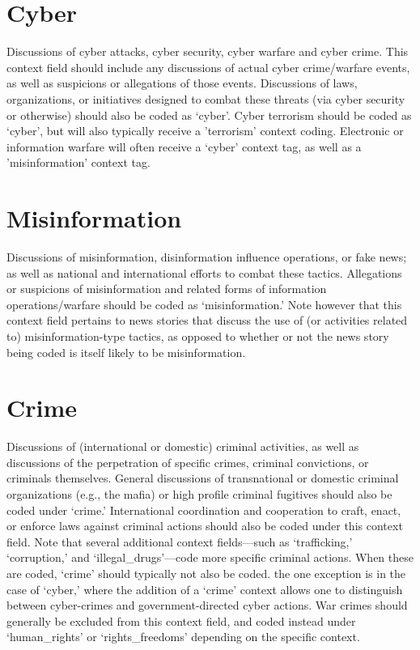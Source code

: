 \documentclass[11pt]{report}
\begin{document}
\section{Cyber}\label{context:cyber}
Discussions of cyber attacks, cyber security, cyber warfare and cyber crime. This context field should include any discussions of actual cyber crime/warfare events, as well as suspicions or allegations of those events. Discussions of laws, organizations, or initiatives designed to combat these threats (via cyber security or otherwise) should also be coded as `cyber'. Cyber terrorism should be coded as `cyber', but will also typically receive a 'terrorism' context coding. Electronic or information warfare will often receive a `cyber' context tag, as well as a 'misinformation' context tag.


\section{Misinformation}\label{context:misinfo}
Discussions of misinformation, disinformation influence operations, or fake news; as well as national and international efforts to combat these tactics. Allegations or suspicions of misinformation and related forms of information operations/warfare should be coded as `misinformation.' Note however that this context field pertains to news stories that discuss the use of (or activities related to) misinformation-type tactics, as opposed to whether or not the news story being coded is itself likely to be misinformation.



\section{Crime}\label{context:crime}

Discussions of (international or domestic) criminal activities, as well as discussions of the perpetration of specific crimes, criminal convictions, or criminals themselves. General discussions of transnational or domestic criminal organizations (e.g., the mafia) or high profile criminal fugitives should also be coded under    `crime.' International coordination and cooperation to craft, enact, or enforce laws against criminal actions should also be coded under this context field. Note that several additional context fields---such as  `trafficking,'  `corruption,' and `illegal\_drugs'---code more specific criminal actions. When these are coded, `crime' should typically not also be coded. the one exception is in the case of `cyber,' where the addition of a `crime' context allows one to distinguish between cyber-crimes and government-directed cyber actions. War crimes should generally be excluded from this context field, and coded instead under `human\_rights' or `rights\_freedoms' depending on the specific context.
\end{document}
